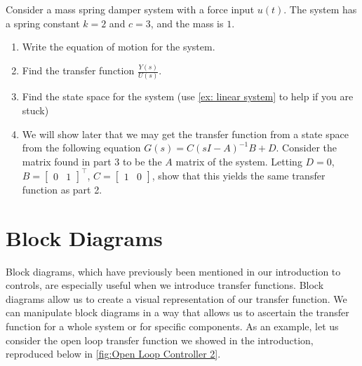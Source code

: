 \begin{exercise}\label{exer_mass_spring_tf}
Consider a mass spring damper system with a force input $u(t)$. The system has a spring constant $k=2$ and $c=3$, and the mass is $1$.
\begin{enumerate}
    \item Write the equation of motion for the system.
    \item Find the transfer function $\frac{Y(s)}{U(s)}$.
    \item Find the state space for the system (use \autoref{ex: linear system} to help if you are stuck)
    \item We will show later that we may get the transfer function from a state space from the following equation $G(s)=C(sI-A)^{-1}B+D$. Consider the matrix found in part 3 to be the $A$ matrix of the system. Letting $D=0$, $B=\begin{bmatrix}
        0&1
    \end{bmatrix}^\top$, $C=\begin{bmatrix}
        1&0
    \end{bmatrix}$, show that this yields the same transfer function as part 2.
\end{enumerate}
\end{exercise}
    

\section{Block Diagrams}
Block diagrams, which have previously been mentioned in our introduction to controls, are especially useful when we introduce transfer functions. Block diagrams allow us to create a visual representation of our transfer function.  We can manipulate block diagrams in a way that allows us to ascertain the transfer function for a whole system or for specific components. As an example, let us consider the open loop transfer function we showed in the introduction, reproduced below in \autoref{fig:Open Loop Controller 2}.

